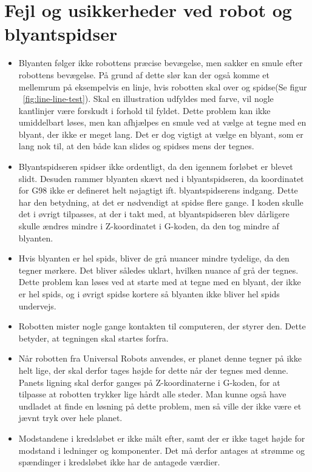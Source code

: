 \section{Fejl og usikkerheder ved robot og blyantspidser}

\begin{itemize}
\item Blyanten følger ikke robottens præcise bevægelse, men sakker en smule efter robottens bevægelse. På grund af dette slør kan der også komme et mellemrum på eksempelvis en linje, hvis robotten skal over og spidse(Se figur ~\ref{fig:line-line-test}). Skal en illustration udfyldes med farve, vil nogle kantlinjer være forskudt i forhold til fyldet. Dette problem kan ikke umiddelbart løses, men kan afhjælpes en smule ved at vælge at tegne med en blyant, der ikke er meget lang. Det er dog vigtigt at vælge en blyant, som er lang nok til, at den både kan slides og spidses mens der tegnes.

\item Blyantspidseren spidser ikke ordentligt, da den igennem forløbet er blevet slidt. Desuden rammer blyanten skævt ned i blyantspidseren, da koordinatet for G98 ikke er defineret helt nøjagtigt ift. blyantspidserens indgang. Dette har den betydning, at det er nødvendigt at spidse flere gange. I koden skulle det i øvrigt tilpasses, at der i takt med, at blyantspidseren blev dårligere skulle ændres mindre i Z-koordinatet i G-koden, da den tog mindre af blyanten.

\item Hvis blyanten er hel spids, bliver de grå nuancer mindre tydelige, da den tegner mørkere. Det bliver således uklart, hvilken nuance af grå der tegnes. Dette problem kan løses ved at starte med at tegne med en blyant, der ikke er hel spids, og i øvrigt spidse kortere så blyanten ikke bliver hel spids undervejs.

\item Robotten mister nogle gange kontakten til computeren, der styrer den. Dette betyder, at tegningen skal startes forfra.

\item Når robotten fra Universal Robots anvendes, er planet denne tegner på ikke helt lige, der skal derfor tages højde for dette når der tegnes med denne. Panets ligning skal derfor ganges på Z-koordinaterne i G-koden, for at tilpasse at robotten trykker lige hårdt alle steder. Man kunne også have undladet at finde en løsning på dette problem, men så ville der ikke være et jævnt tryk over hele planet. 

\item Modstandene i kredsløbet er ikke målt efter, samt der er ikke taget højde for modstand i ledninger og komponenter. Det må derfor antages at strømme og spændinger i kredsløbet ikke har de antagede værdier.
\end{itemize}

